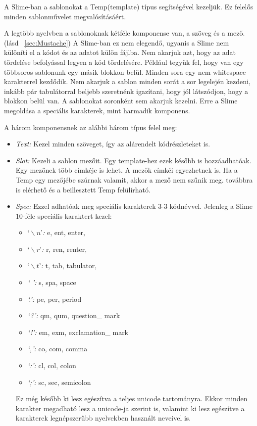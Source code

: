 A Slime-ban a sablonokat a Temp(template) típus segítségével kezeljük. Ez felelős minden sablonművelet megvalósításáért.

A legtöbb nyelvben a sablonoknak kétféle komponense van, a szöveg és a mező. (lásd ~\ref{sec:Mustache})
A Slime-ban ez nem elegendő, ugyanis a Slime nem különíti el a kódot és az adatot külön fájlba.
Nem akarjuk azt, hogy az adat tördelése befolyással legyen a kód tördelésére.
Például tegyük fel, hogy van egy többsoros sablonunk egy másik blokkon belül.
Minden sora egy nem whitespace karakterrel kezdődik.
Nem akarjuk a sablon minden sorát a sor legelején kezdeni, inkább pár tabulátorral beljebb szeretnénk igazítani, hogy jól látszódjon, hogy a blokkon belül van.
A sablonokat soronként sem akarjuk kezelni.
Erre a Slime megoldása a speciális karakterek, mint harmadik komponens.

A három komponensnek az alábbi három típus felel meg:
\begin{itemize}
\item \emph{Text:} 
Kezel minden szöveget, így az alárendelt kódrészleteket is.
\item \emph{Slot:} 
Kezeli a sablon mezőit.
Egy template-hez ezek később is hozzáadhatóak.
Egy mezőnek több címkéje is lehet.
A mezők címkéi egyezhetnek is.
Ha a Temp egy mezőjébe szúrnak valamit, akkor a mező nem szűnik meg.
továbbra is elérhető és a beillesztett Temp felülírható.
\item \emph{Spec:} 
Ezzel adhatóak meg speciális karakterek 3-3 kódnévvel.
Jelenleg a Slime 10-féle speciális karaktert kezel:
\begin{itemize}
\item \emph{\textit{$‘\backslash n’$}:} e, ent, enter, 
\item \emph{\textit{$‘\backslash r’$}:} r, ren, renter, 
\item \emph{\textit{$‘\backslash t’$}:} t, tab, tabulator, 
\item \emph{\textit{‘ ’}:} s, spa, space 
\item \emph{\textit{‘.’}:} pe, per, period 
\item \emph{\textit{‘?’}:} qm, qum, question\_ mark 
\item \emph{\textit{‘!’}:} em, exm, exclamation\_ mark 
\item \emph{\textit{‘,’}:} co, com, comma
\item \emph{\textit{‘:’}:} cl, col, colon 
\item \emph{\textit{‘;’}:} sc, sec, semicolon
\end{itemize}
Ez még később ki lesz egészítva a teljes unicode tartományra. Ekkor minden karakter megadható lesz a unicode-ja szerint is, valamint ki lesz egészítve a karakterek legnépszerűbb nyelvekben használt neveivel is.
\end{itemize}

